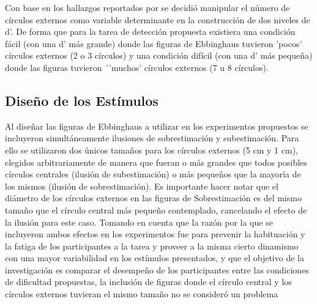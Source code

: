 Con base en los hallazgos reportados por \parencite{Massaro1971} se decidió manipular el número de círculos externos como variable determinante en la construcción de dos niveles de d'. De forma que para la tarea de detección propuesta existiera una condición fácil (con una d' más grande) donde las figuras de Ebbinghaus tuvieron 'pocos' círculos externos (2 o 3 círculos) y una condición difícil (con una d' más pequeña) donde las figuras tuvieron ´'muchos' círculos externos (7 u 8 círculos).\\ 

\subsection{Diseño de los Estímulos}

Al diseñar las figuras de Ebbinghaus a utilizar en los experimentos propuestos se incluyeron simultáneamente ilusiones de sobrestimación y subestimación. Para ello se utilizaron dos únicos tamaños para los círculos externos (5 cm y 1 cm), elegidos arbitrariamente de manera que fueran o más grandes que todos posibles círculos centrales (ilusión de subestimación) o más pequeños que la mayoría de los mismos (ilusión de sobrestimación). Es importante hacer notar que el diámetro de los círculos externos en las figuras de Sobrestimación es del mismo tamaño que el círculo central más pequeño contemplado, cancelando el efecto de la ilusión para este caso. Tomando en cuenta que la razón por la que se incluyeron ambos efectos en los experimentos fue para prevenir la habituación y la fatiga de los participantes a la tarea y proveer a la misma cierto dinamismo con una mayor variabilidad en los estímulos presentados, y que el objetivo de la investigación es comparar el desempeño de los participantes entre las condiciones de dificultad propuestas, la inclusión de figuras donde el círculo central y los círculos externos tuvieran el mismo tamaño no se consideró un problema\\

